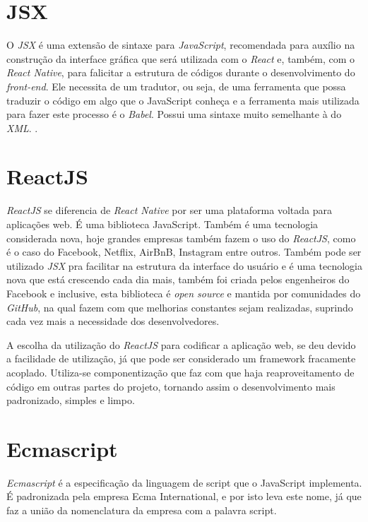 \section{JSX}
O \textit{JSX} é uma extensão de sintaxe para \textit{JavaScript}, recomendada para auxílio na construção da interface gráfica que será utilizada com o \textit{React} e, também, com o \textit{React Native}, para falicitar a estrutura de códigos durante o desenvolvimento do \textit{front-end}. Ele necessita de um tradutor, ou seja, de uma ferramenta que possa traduzir o código em algo que o JavaScript conheça e a ferramenta mais utilizada para fazer este processo é o \textit{Babel}. Possui uma sintaxe muito semelhante à do \textit{XML}.  
\cite{jsx}.


\section{ReactJS}
\textit{ReactJS} se diferencia de \textit{React Native} por ser uma plataforma voltada para aplicações web. É uma biblioteca JavaScript. Também é uma tecnologia considerada nova, hoje grandes empresas também fazem o uso do \textit{ReactJS}, como é o caso do Facebook, Netflix, AirBnB, Instagram entre outros. Também pode ser utilizado \textit{JSX} pra facilitar na estrutura da interface do usuário e é uma tecnologia nova que está crescendo cada dia mais, também foi criada pelos engenheiros do Facebook e inclusive, esta biblioteca é \textit{open source} e mantida por comunidades do \textit{GitHub}, na qual fazem com que melhorias constantes sejam realizadas, suprindo cada vez mais a necessidade dos desenvolvedores. \cite{react}

A escolha da utilização do \textit{ReactJS} para codificar a aplicação web, se deu devido a facilidade de utilização, já que pode ser considerado um framework fracamente acoplado. Utiliza-se componentização que faz com que haja reaproveitamento de código em outras partes do projeto, tornando assim o desenvolvimento mais padronizado, simples e limpo.

\section{Ecmascript}

\textit{Ecmascript} é a especificação da linguagem de script que o JavaScript implementa. É padronizada pela empresa Ecma International, e por isto leva este nome, já que faz a união da nomenclatura da empresa com a palavra script. 

